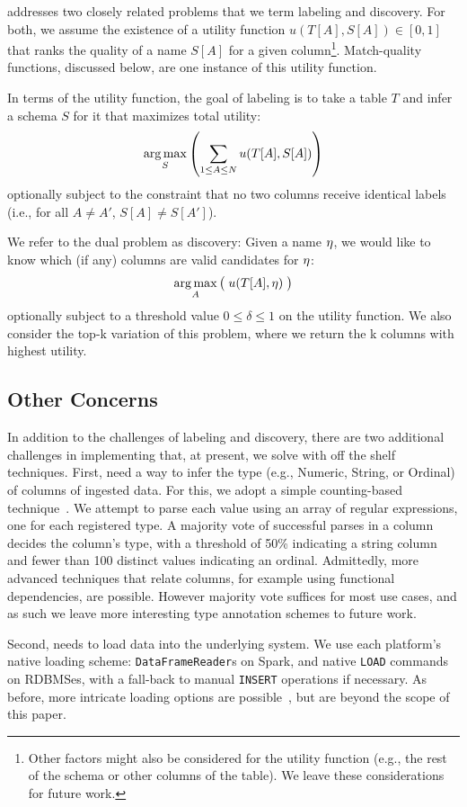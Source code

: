 \systemname addresses two closely related problems that we term labeling and discovery.
For both, we assume the existence of a utility function $u(T[A], S[A]) \in [0, 1]$ that ranks the quality of a name $S[A]$ for a given column\footnote{Other factors might also be considered for the utility function (e.g., the rest of the schema or other columns of the table).  We leave these considerations for future work.}.  
Match-quality functions, discussed below, are one instance of this utility function.

In terms of the utility function, the goal of labeling is to take a table $T$ and infer a schema $S$ for it that maximizes total utility:
$$\operatorname*{arg\,max}_{S}\left(\sum_{1 \leq A \leq N}u(T[A], S[A])\right)$$ 
optionally subject to the constraint that no two columns receive identical labels (i.e., for all $A \neq A'$, $S[A] \neq S[A']$).

We refer to the dual problem as discovery: Given a name $\eta$, we would like to know which (if any) columns are valid candidates for $\eta$:
$$\operatorname*{arg\,max}_{A}\big(\; u(T[A], \eta)\;\big)$$
optionally subject to a threshold value $0 \leq \delta \leq 1$ on the utility function.  We also consider the top-k variation of this problem, where we return the k columns with highest utility.

\subsection{Other Concerns}
In addition to the challenges of labeling and discovery, there are two additional challenges in implementing \systemname that, at present, we solve with off the shelf techniques.
First, \systemname need a way to infer the type (e.g., Numeric, String, or Ordinal) of columns of ingested data.  
For this, we adopt a simple counting-based technique~\cite{yang2015lenses}.
We attempt to parse each value using an array of regular expressions, one for each registered type.
A majority vote of successful parses in a column decides the column's type, with a threshold of 50\% indicating a string column and fewer than 100 distinct values indicating an ordinal.
Admittedly, more advanced techniques that relate columns, for example using functional dependencies, are possible.
However majority vote suffices for most use cases, and as such we leave more interesting type annotation schemes to future work.

Second, \systemname needs to load data into the underlying system.  
We use each platform's native loading scheme: \texttt{DataFrameReader}s on Spark, and native \texttt{LOAD} commands on RDBMSes, with a fall-back to manual \texttt{INSERT} operations if necessary.
As before, more intricate loading options are possible~\cite{DBLP:conf/sigmod/AlagiannisBBIA12,DBLP:conf/cidr/IdreosKM07}, but are beyond the scope of this paper.






